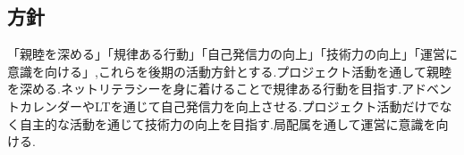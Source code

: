 \subsection*{\firstGrade{}方針}



「親睦を深める」「規律ある行動」「自己発信力の向上」「技術力の向上」「運営に意識を向ける」,これらを{\firstGrade{}}後期の活動方針とする.プロジェクト活動を通して親睦を深める.ネットリテラシーを身に着けることで規律ある行動を目指す.アドベントカレンダーやLTを通じて自己発信力を向上させる.プロジェクト活動だけでなく自主的な活動を通じて技術力の向上を目指す.局配属を通して運営に意識を向ける.
